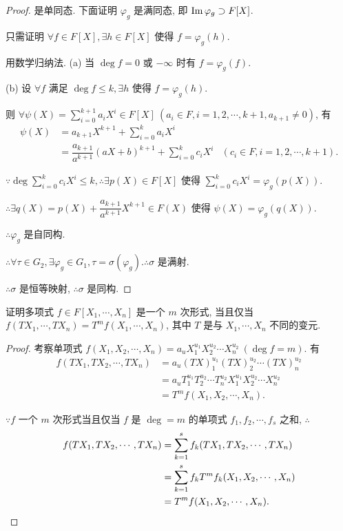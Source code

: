 \documentclass[color=black,device=normal,lang=cn,mode=geye]{elegantnote}
\begin{document}
\begin{proof}
    是单同态. 下面证明 $\varphi_g$ 是满同态, 即 $\operatorname{Im} \varphi_g\supset F[X]$.

    只需证明 $\forall f\in F[X],\exists h\in F[X]$ 使得 $f=\varphi_g(h)$.

    用数学归纳法. (a) 当 $\deg f=0$ 或 $-\infty$ 时有 $f=\varphi_g(f)$.

    (b) 设 $\forall f$ 满足 $\deg f\leq k,\exists h$ 使得 $f=\varphi_g(h)$.

    则 $\forall\psi(X)=\sum\limits_{i=0}^{k+1}a_iX^i\in F[X]\ (a_i\in F,i=1,2,\cdots,k+1,a_{k+1}\neq0)$, 有
    \begin{align*}
        \psi(X) & =a_{k+1}X^{k+1}+\sum\limits_{i=0}^{k}a_iX^i \\
        & =\dfrac{a_{k+1}}{a^{k+1}}(aX+b)^{k+1}+\sum\limits_{i=0}^{k}c_iX^i & (c_i\in F,i=1,2,\cdots,k+1).
    \end{align*}

    $\because\deg\sum\limits_{i=0}^{k}c_iX^i\leq k,\therefore\exists p(X)\in F[X]$ 使得 $\sum\limits_{i=0}^{k}c_iX^i=\varphi_g(p(X))$.

    $\therefore\exists q(X)=p(X)+\dfrac{a_{k+1}}{a^{k+1}}X^{k+1}\in F(X)$ 使得 $\psi(X)=\varphi_g(q(X))$.

    $\therefore\varphi_g$ 是自同构.

    $\therefore\forall\tau\in G_2,\exists\varphi_g\in G_1,\tau=\sigma(\varphi_g).\therefore\sigma$ 是满射.

    $\therefore\sigma$ 是恒等映射, $\therefore\sigma$ 是同构.
\end{proof}
\begin{exercise}%
    证明多项式 $f\in F[X_1,\cdots,X_n]$ 是一个 $m$ 次形式, 当且仅当 $f(TX_1,\cdots,TX_n)=T^mf(X_1,\cdots,X_n)$, 其中 $T$ 是与 $X_1,\cdots,X_n$ 不同的变元.
\end{exercise}
\begin{proof}
    考察单项式 $f(X_1,X_2,\cdots,X_n)=a_uX^{u_1}_1X^{u_2}_2\cdots X^{u_2}_n\ (\deg f=m)$. 有
    \begin{align*}
        f(TX_1,TX_2,\cdots,TX_n) & =a_u(TX)^{u_1}_1(TX)^{u_2}_2\cdots (TX)^{u_2}_n \\
        & =a_uT^{u_1}_1T^{u_2}_2\cdots T^{u_2}_nX^{u_1}_1X^{u_2}_2\cdots X^{u_2}_n \\
        & =T^mf(X_1,X_2,\cdots,X_n).
    \end{align*}

    $\because f$ 一个 $m$ 次形式当且仅当 $f$ 是 $\deg=m$ 的单项式 $f_1,f_2,\cdots,f_s$ 之和, $\therefore$
    \begin{align*}
        f(TX_1,TX_2,\cdots,TX_n) & =\sum\limits_{k=1}^sf_k(TX_1,TX_2,\cdots,TX_n) \\
        & =\sum\limits_{k=1}^sf_kT^mf_k(X_1,X_2,\cdots,X_n) \\
        & =T^mf(X_1,X_2,\cdots,X_n).\qedhere
    \end{align*}
\end{proof}
\end{document}
